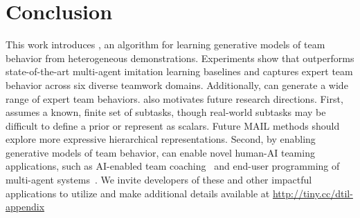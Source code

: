 \section{Conclusion}
This work introduces \ouralg, an algorithm for learning generative models of team behavior from heterogeneous demonstrations. Experiments show that \ouralg outperforms state-of-the-art multi-agent imitation learning baselines and captures expert team behavior across six diverse teamwork domains. Additionally, \ouralg can generate a wide range of expert team behaviors.
\ouralg also motivates future research directions. First, \ouralg assumes a known, finite set of subtasks, though real-world subtasks may be difficult to define a prior or represent as scalars. Future MAIL methods should explore more expressive hierarchical representations. Second, by enabling generative models of team behavior, \ouralg can enable novel human-AI teaming applications, such as AI-enabled team coaching~\cite{seo2021towards, seo2025socratic} and end-user programming of multi-agent systems~\cite{ajaykumar2021survey, stegner2024understanding}. We invite developers of these and other impactful applications to utilize \ouralg and make additional details available at \url{http://tiny.cc/dtil-appendix}
